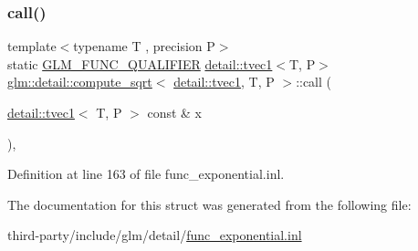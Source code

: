 \subsubsection{\texorpdfstring{call()}{call()}}
{\footnotesize\ttfamily template$<$typename T , precision P$>$ \\
static \hyperlink{setup_8hpp_a33fdea6f91c5f834105f7415e2a64407}{G\+L\+M\+\_\+\+F\+U\+N\+C\+\_\+\+Q\+U\+A\+L\+I\+F\+I\+ER} \hyperlink{structglm_1_1detail_1_1tvec1}{detail\+::tvec1}$<$T, P$>$ \hyperlink{structglm_1_1detail_1_1compute__sqrt}{glm\+::detail\+::compute\+\_\+sqrt}$<$ \hyperlink{structglm_1_1detail_1_1tvec1}{detail\+::tvec1}, T, P $>$\+::call (\begin{DoxyParamCaption}\item[{\hyperlink{structglm_1_1detail_1_1tvec1}{detail\+::tvec1}$<$ T, P $>$ const \&}]{x }\end{DoxyParamCaption})\hspace{0.3cm}{\ttfamily [inline]}, {\ttfamily [static]}}



Definition at line 163 of file func\+\_\+exponential.\+inl.



The documentation for this struct was generated from the following file\+:\begin{DoxyCompactItemize}
\item 
third-\/party/include/glm/detail/\hyperlink{func__exponential_8inl}{func\+\_\+exponential.\+inl}\end{DoxyCompactItemize}

